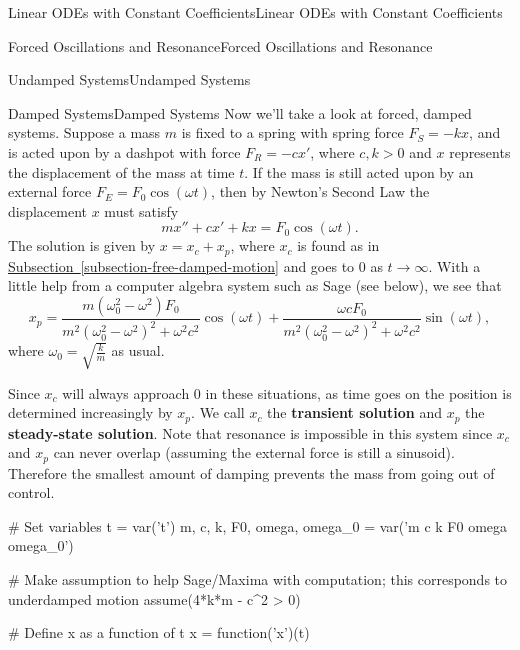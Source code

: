 \documentclass[10pt,]{book}
\newcommand{\terminology}[1]{\textbf{#1}}
\numberwithin{equation}{section}
\newcommand{\gt}{>}
\begin{document}
\begin{chapterptx}{Linear ODEs with Constant Coefficients}{}{Linear ODEs with Constant Coefficients}{}{}
\begin{sectionptx}{Forced Oscillations and Resonance}{}{Forced Oscillations and Resonance}{}{}
\begin{subsectionptx}{Undamped Systems}{}{Undamped Systems}{}{}
\end{subsectionptx}
%
%
\typeout{************************************************}
\typeout{************************************************}
%
\begin{subsectionptx}{Damped Systems}{}{Damped Systems}{}{}\label{subsection-damped-systems}
\hypertarget{p-253}{}%
Now we'll take a look at forced, damped systems. Suppose a mass \(m\) is fixed to a spring with spring force \(F_{S} = -kx\), and is acted upon by a dashpot with force \(F_{R} = -cx'\), where \(c,k \gt 0\) and \(x\) represents the displacement of the mass at time \(t\). If the mass is still acted upon by an external force \(F_{E} = F_{0}\cos(\omega t)\), then by Newton's Second Law the displacement \(x\) must satisfy%
\begin{equation*}
mx'' + cx' + kx = F_{0}\cos(\omega t).
\end{equation*}
The solution is given by \(x = x_{c} + x_{p}\), where \(x_{c}\) is found as in \hyperref[subsection-free-damped-motion]{Subsection~\ref{subsection-free-damped-motion}} and goes to \(0\) as \(t\to\infty\). With a little help from a computer algebra system such as Sage (see below), we see that%
\begin{equation*}
x_{p} = \frac{m(\omega_{0}^{2} - \omega^{2})F_{0}}{m^{2}(\omega_{0}^{2} - \omega^{2})^{2} + \omega^{2}c^{2}}\cos(\omega t) + \frac{\omega c F_{0}}{m^{2}(\omega_{0}^{2} - \omega^{2})^{2} + \omega^{2}c^{2}}\sin(\omega t),
\end{equation*}
where \(\omega_{0} = \sqrt{\frac{k}{m}}\) as usual.%
\par
\hypertarget{p-254}{}%
Since \(x_{c}\) will always approach \(0\) in these situations, as time goes on the position is determined increasingly by \(x_{p}\). We call \(x_{c}\) the \terminology{transient solution} and \(x_{p}\) the \terminology{steady-state solution}. Note that resonance is impossible in this system since \(x_{c}\) and \(x_{p}\) can never overlap (assuming the external force is still a sinusoid). Therefore the smallest amount of damping prevents the mass from going out of control.%
\begin{sageinput}
# Set variables
t = var('t')
m, c, k, F0, omega, omega_0 = var('m c k F0 omega omega_0')

# Make assumption to help Sage/Maxima with computation; this corresponds to underdamped motion
assume(4*k*m - c^2 > 0)

# Define x as a function of t
x = function('x')(t)


\end{sageinput}
\end{subsectionptx}
\end{sectionptx}
\end{chapterptx}
\end{document}
